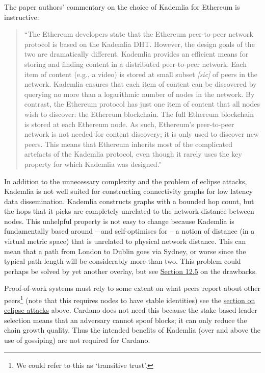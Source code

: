 \documentclass[11pt,a4paper]{article}
\begin{document}
The paper authors' commentary on the choice of Kademlia for Ethereum is
instructive:

\begin{quote}
``The Ethereum developers state that the Ethereum peer-to-peer network
protocol is based on the Kademlia DHT. However, the design goals of the
two are dramatically different. Kademlia provides an efficient means for
storing and finding content in a distributed peer-to-peer network. Each
item of content (e.g., a video) is stored at small subset
\emph{{[}sic{]}} of peers in the network. Kademlia ensures that each
item of content can be discovered by querying no more than a logarithmic
number of nodes in the network. By contrast, the Ethereum protocol has
just one item of content that all nodes wish to discover: the Ethereum
blockchain. The full Ethereum blockchain is stored at each Ethereum
node. As such, Ethereum's peer-to-peer network is not needed for content
discovery; it is only used to discover new peers. This means that
Ethereum inherits most of the complicated artefacts of the Kademlia
protocol, even though it rarely uses the key property for which Kademlia
was designed.''
\end{quote}

In addition to the unnecessary complexity and the problem of eclipse
attacks, Kademlia is not well suited for constructing connectivity
graphs for low latency data dissemination. Kademlia constructs graphs
with a bounded hop count, but the hops that it picks are completely
unrelated to the network distance between nodes. This unhelpful property
is not easy to change because Kademlia is fundamentally based around --
and self-optimises for -- a notion of distance (in a virtual metric
space) that is unrelated to physical network distance. This can mean
that a path from London to Dublin goes via Sydney, or worse since the
typical path length will be considerably more than two. This problem
could perhaps be solved by yet another overlay, but see
\protect\hyperlink{comparison-with-general-overlay-networks}{{Section
12.5}} on the drawbacks.

Proof-of-work systems must rely to some extent on what peers report
about other peers\footnote{We could refer to this as `transitive trust'.}
(note that this requires nodes to have stable identities) see the
\protect\hyperlink{eclipse-attacks}{{section on eclipse attacks}} above.
Cardano does not need this because the stake-based leader selection
means that an adversary cannot spoof blocks; it can only reduce the
chain growth quality. Thus the intended benefits of Kademlia (over and
above the use of gossiping) are not required for Cardano.
\end{document}
